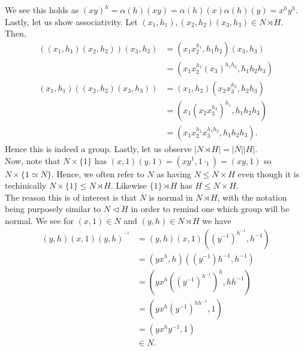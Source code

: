 We see this holds as \(\left( xy \right) ^{h} = \alpha \left( h \right) \left( x y\right) = \alpha \left( h \right) \left( x \right) \alpha \left( h \right) \left( y \right) = x^{h}y^{h} \).\\
Lastly, let us show associativity. Let \(\left( x_1, h_1 \right) , \left( x_2, h_2 \right) \left( x_3, h_3 \right)  \in N \rtimes H\). Then,
\begin{align*}
	\left( \left( x_1, h_1 \right) \left( x_2, h_2 \right)  \right) \left( x_3, h_3 \right) &= \left( x_1x_2^{h_1}, h_1 h_2 \right) \left( x_3, h_3 \right)\\
												&= \left( x_1x_2^{h_1}\left( x_3 \right) ^{h_1h_2}, h_1 h_2 h_3 \right)  \\
	\left( x_1, h_1 \right) \left( \left( x_2, h_2 \right) \left( x_3, h_3 \right)  \right) &=  \left( x_1, h_2 \right) \left( x_2x_3^{h_2}, h_2h_3 \right)  \\
												&= \left( x_1 \left( x_2x_3^{h_2} \right)^{h_1}, h_1 h_2 h_3 \right)  \\
												&= \left( x_1 x_2^{h_1}x_3^{h_1h_2}, h_1 h_2 h_3\right)
.\end{align*}
Hence this is indeed a group. Lastly, let us observe \(\left|  N \rtimes H\right| = \left| N \right| \left| H \right|  \).\\
Now, note that \(N \times \{1\} \) has \(\left( x, 1\right) \left( y, 1 \right)  = \left( xy^{1}, 1\cdot_1 \right) = \left( xy, 1 \right)  \) so \(N \times \{1 \simeq N\} \). Hence, we often refer to \(N\) as having  \(N \le N \times H\) even though it is techinically \(N \times \{1\}  \le N \rtimes H\). Likewise \(\{1\} \rtimes H\) has \(H \le N \times H\).\\
The reason this is of interest is that \(N\) is normal in \(N \rtimes H\), with the notation being purposely similar to \(N \triangleleft H\) in order to remind one which group will be normal.
We see for \(\left( x, 1 \right) \in N\) and \(\left( y, h \right) \in N \rtimes H\) we have \begin{align*}
	\left( y, h \right) \left( x, 1 \right) \left( y, h \right) ^{^{-1}} &=  \left( y, h \right) \left( x, 1\right) \left( \left( y^{-1} \right) ^{h^{-1}}, h^{-1} \right)  \\
									     &= \left( yx^{h}, h \right) \left( \left( y^{-1} \right) h^{-1} , h^{-1}\right)  \\
									     &= \left( yx^{h} \left( \left( y^{-1} \right) ^{h^{-1}} \right) ^{h}, h h^{-1} \right)  \\
									     &= \left( yx^{h}\left( y^{-1} \right) ^{hh^{-1}}, 1 \right)  \\
									     &= \left( yx^{h}y^{-1}, 1 \right)\\
									     &\in N
.					\end{align*}

